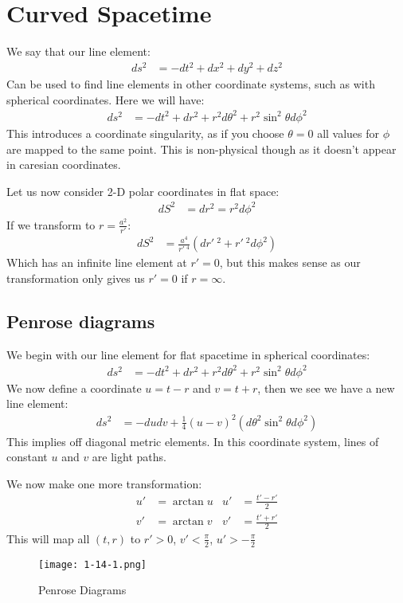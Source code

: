\section{Curved Spacetime}
We say that our line element:
\begin{align*}
	ds^2 &= -dt^2 + dx^2 + dy^2 + dz^2
\end{align*}
Can be used to find line elements in other coordinate systems, such as with spherical coordinates. Here we will have:
\begin{align*}
	ds^2 &= -dt^2 + dr^2 + r^2 d\theta^2 + r^2\sin^2\theta d\phi^2
\end{align*}
This introduces a coordinate singularity, as if you choose $\theta=0$ all values for $\phi$ are mapped to the same point. This is non-physical though as it doesn't appear in caresian coordinates.

Let us now consider 2-D polar coordinates in flat space:
\begin{align*}
	dS^2 &= dr^2 = r^2d\phi^2
\end{align*}
If we transform to $r = \frac{a^2}{r'}$:
\begin{align*}
	dS^2 &= \frac{a^4}{r'\ ^4} (dr'\ ^2 + r'\ ^2 d\phi^2)
\end{align*}
Which has an infinite line element at $r' = 0$, but this makes sense as our transformation only gives us $r' = 0$ if $r = \infty$.
\subsection{Penrose diagrams}
We begin with our line element for flat spacetime in spherical coordinates:
\begin{align*}
	ds^2 &= -dt^2 + dr^2 + r^2 d\theta^2 + r^2\sin^2\theta d\phi^2
\end{align*}
We now define a coordinate $u = t - r$ and $v = t + r$, then we see we have a new line element:
\begin{align*}
	ds^2 &= -dudv + \frac{1}{4} (u-v)^2 (d\theta^2 \sin^2\theta d\phi^2)
\end{align*}
This implies off diagonal metric elements. In this coordinate system, lines of constant $u$ and $v$ are light paths.

We now make one more transformation:
\begin{align*}
	u' &= \arctan u &
	u' &= \frac{t' - r'}{2} \\
	v' &= \arctan{v} &
	v' &= \frac{t' + r'}{2}
\end{align*}
This will map all $(t,r)$ to $r' > 0$, $v' < \frac{\pi}{2}$, $u' > -\frac{\pi}{2}$
\begin{figure*}[h]
	\centering
	\texttt{[image: 1-14-1.png]}
	\caption*{Penrose Diagrams}
\end{figure*}

